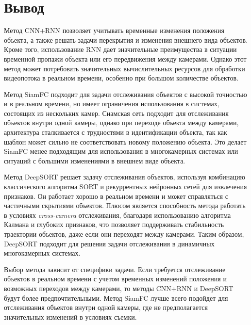 \section{Вывод}

Метод CNN+RNN позволяет учитывать временные изменения положения объекта, а также решать задачи перекрытия и изменения внешнего вида объектов. Кроме того, использование RNN дает значительные преимущества в ситуации временной пропажи объекта или его передвижения между камерами. Однако этот метод может потребовать значительных вычислительных ресурсов для обработки видеопотока в реальном времени, особенно при большом количестве объектов.

Метод SiamFC подходит для задачи отслеживания объектов с высокой точностью и в реальном времени, но имеет ограничения использования в системах, состоящих из нескольких камер. Сиамская сеть подходит для отслеживания объектов внутри одной камеры, однако при переходе объекта между камерами, архитектура сталкивается с трудностями в идентификации объекта, так как шаблон может сильно не соответствовать новому положению объекта. Это делает SiamFC менее подходящим для использования в многокамерных системах или ситуаций с большими изменениями в внешнем виде объекта.

Метод DeepSORT решает задачу отслеживания объектов, используя комбинацию классического алгоритма SORT и рекуррентных нейронных сетей для извлечения признаков. Он работает хорошо в реальном времени и может справляться с частичными скрытиями объектов. Плюсом является способность метода работать в условиях \textit{cross-camera} отслеживания, благодаря использованию алгоритма Калмана и глубоких признаков, что позволяет поддерживать стабильность траектории объектов, даже если они переходят между камерами. Таким образом, DeepSORT подходит для решения задачи отслеживания в динамичных многокамерных системах.

Выбор метода зависит от специфики задачи. Если требуется отслеживание объектов в реальном времени с учетом временных изменений положения и возможных переходов между камерами, то методы CNN+RNN и DeepSORT будут более предпочтительными. Метод SiamFC лучше всего подойдет для отслеживания объектов внутри одной камеры, где не предполагается значительных изменений в условиях съемки.

